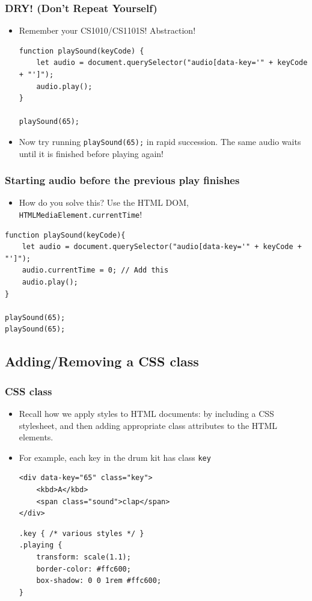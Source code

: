 \documentclass[handout,12pt]{beamer}
\begin{document}
\begin{frame}[fragile]
	\frametitle{DRY! (Don't Repeat Yourself)}
	\begin{itemize}
		\item Remember your CS1010/CS1101S! Abstraction!
		\begin{verbatim}
function playSound(keyCode) {
	let audio = document.querySelector("audio[data-key='" + keyCode + "']");
	audio.play();
}

playSound(65);
		\end{verbatim}
		\pause
		\item Now try running \texttt{playSound(65);} in rapid succession. The same audio waits until it is finished before playing again!
	\end{itemize}
\end{frame}
\begin{frame}[fragile]
	\frametitle{Starting audio before the previous play finishes}
	\begin{itemize}
		\item How do you solve this? Use the HTML DOM, \texttt{HTMLMediaElement.currentTime}\footnotemark!
	\end{itemize}
	\begin{verbatim}
function playSound(keyCode){
	let audio = document.querySelector("audio[data-key='" + keyCode + "']");
	audio.currentTime = 0; // Add this
	audio.play();
}

playSound(65);
playSound(65);
	\end{verbatim}
\end{frame}

\subsection{Adding/Removing a CSS class}
\begin{frame}[fragile]
	\frametitle{CSS class}
	\begin{itemize}
		\item Recall how we apply styles to HTML documents: by including a CSS stylesheet, and then adding appropriate class attributes to the HTML elements.
		\item For example, each key in the drum kit has class \texttt{key}
		\begin{verbatim}
<div data-key="65" class="key">
	<kbd>A</kbd>
	<span class="sound">clap</span>
</div>
		\end{verbatim}
		\begin{verbatim}
.key { /* various styles */ }
.playing {
	transform: scale(1.1);
	border-color: #ffc600;
	box-shadow: 0 0 1rem #ffc600;
}
		\end{verbatim}
	\end{itemize}
\end{frame}
\end{document}
